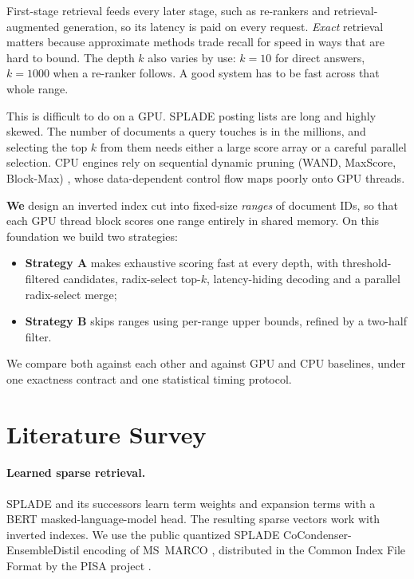 \documentclass[11pt]{article}
\begin{document}
First-stage retrieval feeds every later stage, such as re-rankers and retrieval-augmented generation, so its latency is paid on every request. \emph{Exact} retrieval matters because approximate methods trade recall for speed in ways that are hard to bound. The depth $k$ also varies by use: $k=10$ for direct answers, $k=1000$ when a re-ranker follows. A good system
has to be fast across that whole range.

This is difficult to do on a GPU. SPLADE posting lists are long and highly skewed. The number of
documents a query touches is in the millions, and selecting the top $k$ from them needs either a large
score array or a careful parallel selection. CPU engines rely on sequential dynamic pruning (WAND,
MaxScore, Block-Max) \cite{wand,maxscore,bmw}, whose data-dependent control flow maps poorly onto GPU
threads.

\textbf{We} design an inverted index cut into fixed-size \emph{ranges} of document IDs,
so that each GPU thread block scores one range entirely in shared memory. On this foundation we build
two strategies:
\begin{itemize}
\item \textbf{Strategy A} makes exhaustive scoring fast at every depth, with threshold-filtered
  candidates, radix-select top-$k$, latency-hiding decoding and a parallel radix-select merge;
\item \textbf{Strategy B} skips ranges using per-range upper bounds, refined by a two-half filter.
\end{itemize}
We compare both against each other and against GPU and CPU baselines, under one exactness contract and
one statistical timing protocol.

\section{Literature Survey}

\paragraph{Learned sparse retrieval.} SPLADE \cite{splade} and its successors \cite{spladepp} learn term
weights and expansion terms with a BERT masked-language-model head. The resulting sparse vectors work
with inverted indexes. We use the public quantized SPLADE CoCondenser-EnsembleDistil encoding of
MS~MARCO \cite{msmarco}, distributed in the Common Index File Format \cite{ciff} by the PISA project
\cite{pisa}.
\end{document}
